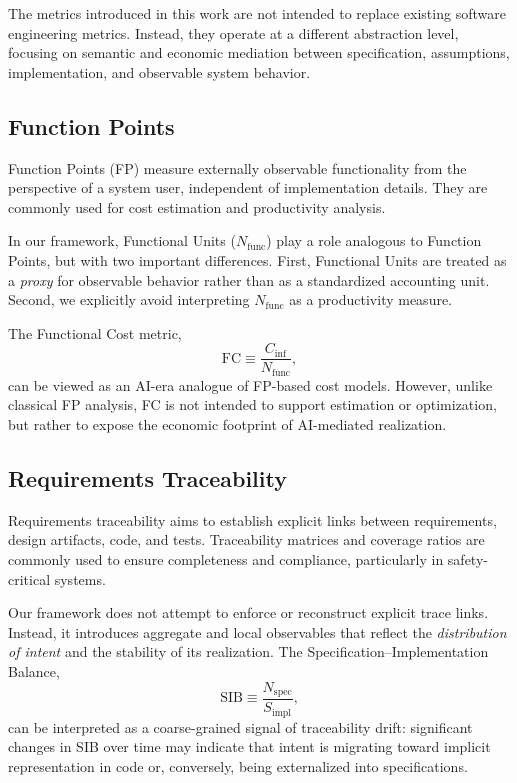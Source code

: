 \documentclass[twocolumn]{aastex701}
\begin{document}
The metrics introduced in this work are not intended to replace existing
software engineering metrics.
Instead, they operate at a different abstraction level, focusing on
semantic and economic mediation between specification, assumptions,
implementation, and observable system behavior.

\subsection{Function Points}

Function Points (FP) measure externally observable functionality from the
perspective of a system user, independent of implementation details.
They are commonly used for cost estimation and productivity analysis.

In our framework, Functional Units ($N_{\mathrm{func}}$) play a role
analogous to Function Points, but with two important differences.
First, Functional Units are treated as a \emph{proxy} for observable behavior
rather than as a standardized accounting unit.
Second, we explicitly avoid interpreting $N_{\mathrm{func}}$ as a productivity
measure.

The Functional Cost metric,
\begin{equation}
\mathrm{FC} \equiv \frac{C_{\mathrm{inf}}}{N_{\mathrm{func}}},
\end{equation}
can be viewed as an AI-era analogue of FP-based cost models.
However, unlike classical FP analysis, FC is not intended to support
estimation or optimization, but rather to expose the economic footprint
of AI-mediated realization.

\subsection{Requirements Traceability}

Requirements traceability aims to establish explicit links between
requirements, design artifacts, code, and tests.
Traceability matrices and coverage ratios are commonly used to ensure
completeness and compliance, particularly in safety-critical systems.

Our framework does not attempt to enforce or reconstruct explicit trace links.
Instead, it introduces aggregate and local observables that reflect the
\emph{distribution of intent} and the stability of its realization.
The Specification--Implementation Balance,
\begin{equation}
\mathrm{SIB} \equiv \frac{N_{\mathrm{spec}}}{S_{\mathrm{impl}}},
\end{equation}
can be interpreted as a coarse-grained signal of traceability drift:
significant changes in SIB over time may indicate that intent is migrating
toward implicit representation in code or, conversely, being externalized
into specifications.
\end{document}
